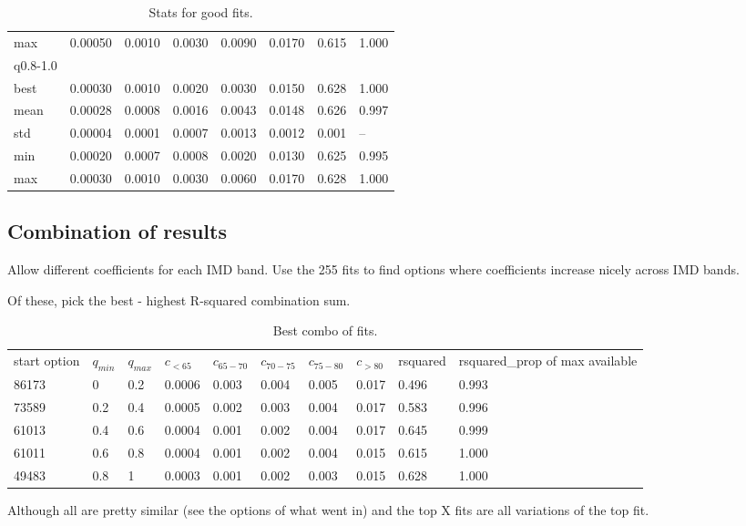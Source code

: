 \documentclass[12pt]{extarticle}
\begin{document}
\begin{table}[h]
\begin{tabular}{l l l l l l l l}
max & 0.00050 & 0.0010 & 0.0030 & 0.0090 & 0.0170 & 0.615 & 1.000 \\
q0.8-1.0 &  &  &  &  &  &  &  \\
best & 0.00030 & 0.0010 & 0.0020 & 0.0030 & 0.0150 & 0.628 & 1.000 \\
mean & 0.00028 & 0.0008 & 0.0016 & 0.0043 & 0.0148 & 0.626 & 0.997 \\
std & 0.00004 & 0.0001 & 0.0007 & 0.0013 & 0.0012 & 0.001 & -- \\
min & 0.00020 & 0.0007 & 0.0008 & 0.0020 & 0.0130 & 0.625 & 0.995 \\
max & 0.00030 & 0.0010 & 0.0030 & 0.0060 & 0.0170 & 0.628 & 1.000 \\
\end{tabular}
    \caption{Stats for good fits.}
    \label{tab:good_coeff_stats}
\end{table}



\subsection{Combination of results}

Allow different coefficients for each IMD band. Use the 255 fits to find options where coefficients increase nicely across IMD bands.

Of these, pick the best - highest R-squared combination sum.


\begin{table}[h]
\centering
\begin{tabular}{l l l l l l l l l l}
start option & $q_{min}$ & $q_{max}$ & $c_{<65}$ & $c_{65-70}$ & $c_{70-75}$ & $c_{75-80}$ & $c_{>80}$ & rsquared & rsquared\_prop of max available \\
86173 & 0 & 0.2 & 0.0006 & 0.003 & 0.004 & 0.005 & 0.017 & 0.496 & 0.993 \\
73589 & 0.2 & 0.4 & 0.0005 & 0.002 & 0.003 & 0.004 & 0.017 & 0.583 & 0.996 \\
61013 & 0.4 & 0.6 & 0.0004 & 0.001 & 0.002 & 0.004 & 0.017 & 0.645 & 0.999 \\
61011 & 0.6 & 0.8 & 0.0004 & 0.001 & 0.002 & 0.004 & 0.015 & 0.615 & 1.000 \\
49483 & 0.8 & 1 & 0.0003 & 0.001 & 0.002 & 0.003 & 0.015 & 0.628 & 1.000 \\
\end{tabular}
    \caption{Best combo of fits.}
    \label{tab:coeffs_best_combo}
\end{table}


Although all are pretty similar (see the options of what went in) and the top X fits are all variations of the top fit.
\end{document}
